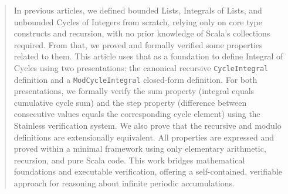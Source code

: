 \begin{abstract}
In previous articles, we defined bounded Lists, Integrals of Lists, and
unbounded Cycles of Integers from scratch, relying only on core type
constructs and recursion, with no prior knowledge of Scala's collections
required. From that, we proved and formally verified some properties related
to them. This article uses that as a foundation to define Integral of Cycles
using two presentations: the canonical recursive \texttt{CycleIntegral}
definition and a \texttt{ModCycleIntegral} closed-form definition. For both
presentations, we formally verify the sum property (integral equals
cumulative cycle sum) and the step property (difference between consecutive
values equals the corresponding cycle element) using the Stainless
verification system. We also prove that the recursive and modulo definitions
are extensionally equivalent. All properties are expressed and proved within
a minimal framework using only elementary arithmetic, recursion, and pure
Scala code. This work bridges mathematical foundations and executable
verification, offering a self-contained, verifiable approach for reasoning
about infinite periodic accumulations.
\end{abstract}

